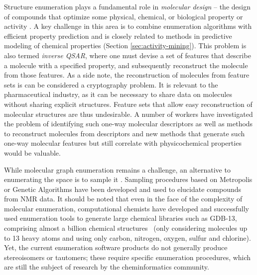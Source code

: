 \documentclass{sig-alternate}
\begin{document}
Structure enumeration plays a fundamental role in \emph{molecular
  design} -- the design of compounds that optimize some physical,
chemical, or biological property or activity
\cite{Schneider:2005uq}. A key challenge in this area is to combine
enumeration algorithms with efficient property prediction and is
closely related to methods in predictive modeling of chemical
properties (Section \ref{sec:activity-mining}). This problem is also
termed \emph{inverse QSAR}, where one must devise a set of features
that describe a molecule with a specified property, and subsequently
reconstruct the molecule from those features. As a side note, the
reconstruction of molecules from feature sets is can be considered a
cryptography problem. It is relevant to the pharmaceutical industry,
as it can be necessary to share data on molecules without sharing
explicit structures. Feature sets that allow easy reconstruction of
molecular structures are thus undesirable. A number of workers have
investigated the problem of identifying such one-way molecular
descriptors as well as methods to reconstruct molecules from
descriptors \cite{Masek:2008kx} and new methods that generate such
one-way molecular features but still correlate with physicochemical
properties would be valuable.

While molecular graph enumeration remains a challenge,
an alternative to enumerating the space is to sample it
\cite{goldberg1999}. Sampling procedures based on Metropolis or
Genetic Algorithms have been developed and used to elucidate
compounds from NMR data. It should be noted that even in the
face of the complexity of molecular enumeration,
computational chemists have developed and successfully used
enumeration tools to generate large chemical libraries such as GDB-13,
comprising almost a billion chemical structures~\cite{GDB} (only
considering molecules up to 13 heavy atoms and using only carbon,
nitrogen, oxygen, sulfur and chlorine). Yet, the current enumeration
software products do not generally produce stereoisomers or tautomers;
these require specific enumeration procedures, which are still the
subject of research by the cheminformatics community.
\end{document}
